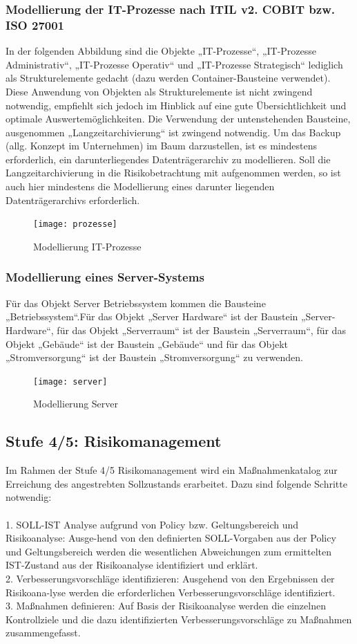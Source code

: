 \subsubsection{Modellierung der IT-Prozesse nach ITIL v2. COBIT bzw. ISO 27001}
In der folgenden Abbildung sind die Objekte „IT-Prozesse“, „IT-Prozesse Administrativ“, „IT-Prozesse Operativ“ und „IT-Prozesse Strategisch“ lediglich als Strukturelemente gedacht (dazu werden Container-Bausteine verwendet). Diese Anwendung von Objekten als Strukturelemente ist nicht zwingend notwendig, empfiehlt sich jedoch im Hinblick auf eine gute Übersichtlichkeit und optimale Auswertemöglichkeiten. Die Verwendung der untenstehenden Bausteine, ausgenommen „Langzeitarchivierung“ ist zwingend notwendig.
Um das Backup (allg. Konzept im Unternehmen) im Baum darzustellen, ist es mindestens erforderlich, ein darunterliegendes Datenträgerarchiv zu modellieren.
Soll die Langzeitarchivierung in die Risikobetrachtung mit aufgenommen werden, so ist auch hier mindestens die Modellierung eines darunter liegenden Datenträgerarchivs erforderlich.
\begin{figure}[htbp]
	\centering
	\texttt{[image: prozesse]}
	\caption{Modellierung IT-Prozesse}
	\label{fig:bsp}
\end{figure}
\subsubsection{Modellierung eines Server-Systems}
Für das Objekt Server Betriebssystem kommen die Bausteine „Betriebssystem“.Für das Objekt „Server Hardware“ ist der Baustein „Server-Hardware“, für das Objekt „Serverraum“ ist der Baustein „Serverraum“, für das Objekt „Gebäude“ ist der Baustein „Gebäude“ und für das Objekt „Stromversorgung“ ist der Baustein „Stromversorgung“ zu verwenden.
\begin{figure}[htbp]
	\centering
	\texttt{[image: server]}
	\caption{Modellierung Server}
	\label{fig:bsp}
\end{figure}

\subsection{Stufe 4/5: Risikomanagement}
Im Rahmen der Stufe 4/5 Risikomanagement wird ein Maßnahmenkatalog zur Erreichung des angestrebten Sollzustands erarbeitet. Dazu sind folgende Schritte notwendig:\\\\
1. SOLL-IST Analyse aufgrund von Policy bzw. Geltungsbereich und Risikoanalyse: Ausge-hend von den definierten SOLL-Vorgaben aus der Policy und Geltungsbereich werden die wesentlichen Abweichungen zum ermittelten IST-Zustand aus der Risikoanalyse identifiziert und erklärt.\\
2. Verbesserungsvorschläge identifizieren: Ausgehend von den Ergebnissen der Risikoana-lyse werden die erforderlichen Verbesserungsvorschläge identifiziert.\\
3. Maßnahmen definieren: Auf Basis der Risikoanalyse werden die einzelnen Kontrollziele und die dazu identifizierten Verbesserungsvorschläge zu Maßnahmen zusammengefasst.

